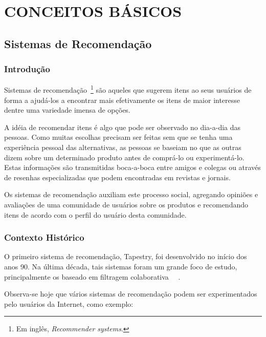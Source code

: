 \chapter{CONCEITOS BÁSICOS} %
\label{cha:conceitos_basicos}

\section{Sistemas de Recomendação}

\subsection{Introdução}
Sistemas de recomendação~\footnote{Em inglês, \textit{Recommender systems}.} são aqueles que sugerem itens ao seus usuários de forma a ajudá-los a encontrar mais efetivamente os itens de maior interesse dentre uma variedade imensa de opções.

A idéia de recomendar itens é algo que pode ser observado no dia-a-dia das pessoas. Como muitas escolhas precisam ser feitas sem que se tenha uma experiência pessoal das alternativas, as pessoas se baseiam no que as outras dizem sobre um determinado produto antes de comprá-lo ou experimentá-lo. Estas informações são transmitidas boca-a-boca entre amigos e colegas ou através de resenhas especializadas que podem encontradas em revistas e jornais.

Os sistemas de recomendação auxiliam este processo social, agregando opiniões e avaliações de uma comunidade de usuários sobre os produtos e recomendando itens de acordo com o perfil do usuário desta comunidade.

\subsection{Contexto Histórico}
O primeiro sistema de recomendação, Tapestry\cite{Goldberg92}, foi desenvolvido no início dos anos 90. Na última década, tais sistemas foram um grande foco de estudo, principalmente os baseado em filtragem colaborativa ~\cite{Resnick97}~\cite{Herlocker04}.

Observa-se hoje que vários sistemas de recomendação podem ser experimentados pelo usuários da Internet, como exemplo:

